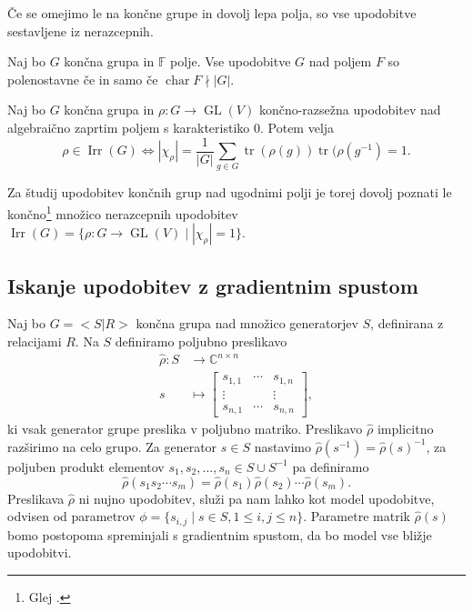 \documentclass[mat2, tisk]{fmfdelo}
\newcommand{\C}{\mathbb C}
\begin{document}
    Če se omejimo le na končne grupe in dovolj lepa polja, so vse
    upodobitve sestavljene iz nerazcepnih.
    \begin{izrek}%
      Naj bo $G$ končna grupa in $\mathbb{F}$
      polje. Vse upodobitve $G$ nad poljem $F$ so polenostavne če in
      samo če $\operatorname{char}F \nmid |G|$.
    \end{izrek}
    \begin{izrek}
      Naj bo $G$ končna grupa in $\rho \colon G \to
      \operatorname{GL}(V)$ končno-razsežna upodobitev nad
      algebraično zaprtim poljem s karakteristiko $0$. Potem velja
      \begin{equation}
        \label{eq:nerazcepna iff norma=1}
        \rho \in \operatorname{Irr}(G) \iff |\chi_\rho| = \frac{1}{|G|}
        \sum\limits_{g \in G} \operatorname{tr}(\rho(g))
        \operatorname{tr}(\rho(g^{-1}) = 1.
        \end{equation}
      \end{izrek}
      Za študij upodobitev končnih grup nad ugodnimi polji je torej
      dovolj poznati le končno\footnote{Glej \cite[poglavje
          \emph{Dekompozicija regularne
      upodobitve}]{jezernik2025upodobitve}.} množico nerazcepnih
      upodobitev $\operatorname{Irr}(G) = \{ \rho \colon G \to
      \operatorname{GL}(V) \mid |\chi_\rho| = 1\}$.
      \subsection{Iskanje upodobitev z gradientnim spustom}
      \label{subsection: Iskanje upodobitev z gradientnim spustom}
      Naj bo $G=<S|R>$ končna grupa nad množico generatorjev $S$,
      definirana z relacijami $R$. Na $S$ definiramo poljubno preslikavo
      \begin{align}
        \label{eq: repr model na S}
        \hat \rho \colon S &\to \C^{n \times n}    \\
        s &\mapsto
        \begin{bmatrix}
          s_{1,1} & \cdots & s_{1,n} \\
          \vdots & & \vdots \\
          s_{n,1} & \cdots & s_{n,n}
        \end{bmatrix},
      \end{align}
      ki vsak generator grupe preslika v poljubno matriko.
      Preslikavo $\hat \rho$ implicitno razširimo na celo grupo. Za
      generator $s \in S$ nastavimo $\hat \rho(s^{-1}) =
      \hat\rho(s)^{-1}$, za poljuben produkt elementov $s_1, s_2,
      \dotsc, s_n \in S \cup S^{-1}$
      pa definiramo
      \begin{equation}
        \label{eq: implicitna definicija upodovbitve}
        \hat \rho(s_1 s_2 \dotsm s_m) = \hat\rho(s_1)\hat\rho(s_2)
        \dotsm \hat\rho(s_m).
      \end{equation}
      Preslikava $\hat \rho$ ni nujno upodobitev, služi pa nam lahko
      kot model upodobitve, odvisen od parametrov $\phi = \{s_{i,j}
      \mid s \in S, 1 \leq i, j \leq n\}$.
      Parametre matrik $\hat\rho(s)$ bomo postopoma spreminjali s
      gradientnim spustom, da bo model vse bližje upodobitvi.
\end{document}
